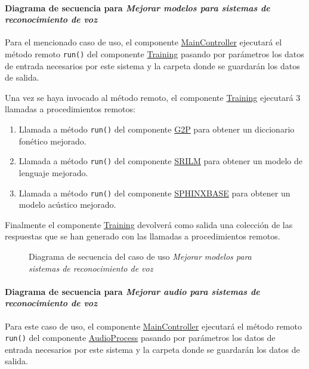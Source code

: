 \documentclass[../main.tex]{subfiles}
\begin{document}
\paragraph{Diagrama de secuencia para \textit{Mejorar modelos para sistemas de reconocimiento de voz}}
Para el mencionado caso de uso, el componente \hyperref[par:maincontroller]{MainController} ejecutará el método remoto \verb+run()+ del componente  \hyperref[par:training]{Training} pasando por parámetros los datos de entrada necesarios por este sistema y la carpeta donde se guardarán los datos de salida.

Una vez se haya invocado al método remoto, el componente \hyperref[par:training]{Training} ejecutará 3 llamadas a procedimientos remotos:
\begin{enumerate}
    \item Llamada a método \verb+run()+ del componente \hyperref[par:g2p]{G2P} para obtener un diccionario fonético mejorado.
    \item Llamada a método \verb+run()+ del componente \hyperref[par:srilm]{SRILM} para obtener un modelo de lenguaje mejorado.
    \item Llamada a método \verb+run()+ del componente \hyperref[par:sphinxbase]{SPHINXBASE} para obtener un modelo acústico mejorado.
\end{enumerate}

Finalmente el componente \hyperref[par:training]{Training} devolverá como salida una colección de las respuestas que se han generado con las llamadas a procedimientos remotos.

\begin{figure}[H]
    \centering
    
    \caption{Diagrama de secuencia del caso de uso \textit{Mejorar modelos para sistemas de reconocimiento de voz}}
    \label{fig:flow_training}
\end{figure}

\paragraph{Diagrama de secuencia para \textit{Mejorar audio para sistemas de reconocimiento de voz}}

Para este caso de uso, el componente \hyperref[par:maincontroller]{MainController} ejecutará el método remoto \verb+run()+ del componente  \hyperref[par:audioprocess]{AudioProcess} pasando por parámetros los datos de entrada necesarios por este sistema y la carpeta donde se guardarán los datos de salida.
\end{document}
